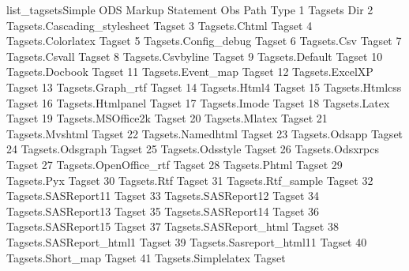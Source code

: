 \begin{fvcode}{list_tagsets}{Simple ODS Markup Statement}
                Obs    Path                             Type
                 1     Tagsets                          Dir   
                 2     Tagsets.Cascading_stylesheet     Tagset
                 3     Tagsets.Chtml                    Tagset
                 4     Tagsets.Colorlatex               Tagset
                 5     Tagsets.Config_debug             Tagset
                 6     Tagsets.Csv                      Tagset
                 7     Tagsets.Csvall                   Tagset
                 8     Tagsets.Csvbyline                Tagset
                 9     Tagsets.Default                  Tagset
                10     Tagsets.Docbook                  Tagset
                11     Tagsets.Event_map                Tagset
                12     Tagsets.ExcelXP                  Tagset
                13     Tagsets.Graph_rtf                Tagset
                14     Tagsets.Html4                    Tagset
                15     Tagsets.Htmlcss                  Tagset
                16     Tagsets.Htmlpanel                Tagset
                17     Tagsets.Imode                    Tagset
                18     Tagsets.Latex                    Tagset
                19     Tagsets.MSOffice2k               Tagset
                20     Tagsets.Mlatex                   Tagset
                21     Tagsets.Mvshtml                  Tagset
                22     Tagsets.Namedhtml                Tagset
                23     Tagsets.Odsapp                   Tagset
                24     Tagsets.Odsgraph                 Tagset
                25     Tagsets.Odsstyle                 Tagset
                26     Tagsets.Odsxrpcs                 Tagset
                27     Tagsets.OpenOffice_rtf           Tagset
                28     Tagsets.Phtml                    Tagset
                29     Tagsets.Pyx                      Tagset
                30     Tagsets.Rtf                      Tagset
                31     Tagsets.Rtf_sample               Tagset
                32     Tagsets.SASReport11              Tagset
                33     Tagsets.SASReport12              Tagset
                34     Tagsets.SASReport13              Tagset
                35     Tagsets.SASReport14              Tagset
                36     Tagsets.SASReport15              Tagset
                37     Tagsets.SASReport_html           Tagset
                38     Tagsets.SASReport_html1          Tagset
                39     Tagsets.Sasreport_html11         Tagset
                40     Tagsets.Short_map                Tagset
                41     Tagsets.Simplelatex              Tagset

\end{fvcode}
